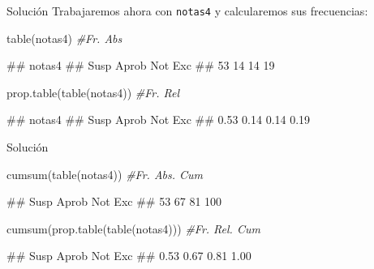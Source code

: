 \documentclass[
  ignorenonframetext,
  aspectratio=169]{beamer}
\newenvironment{Shaded}{\begin{snugshade}}{\end{snugshade}}
\newcommand{\CommentTok}[1]{\textcolor[rgb]{0.56,0.35,0.01}{\textit{#1}}}
\newcommand{\FunctionTok}[1]{\textcolor[rgb]{0.00,0.00,0.00}{#1}}
\newcommand{\NormalTok}[1]{#1}
\let\oldverbatim\verbatim
\let\endoldverbatim\endverbatim
\renewenvironment{verbatim}{\tiny\oldverbatim}{\endoldverbatim}
\begin{document}
\begin{frame}[fragile]{Solución}
\protect\hypertarget{soluciuxf3n-25}{}
Trabajaremos ahora con \texttt{notas4} y calcularemos sus frecuencias:

\begin{Shaded}
\begin{Highlighting}[]
\FunctionTok{table}\NormalTok{(notas4) }\CommentTok{\#Fr. Abs}
\end{Highlighting}
\end{Shaded}

\begin{verbatim}
## notas4
##  Susp Aprob   Not   Exc 
##    53    14    14    19
\end{verbatim}

\begin{Shaded}
\begin{Highlighting}[]
\FunctionTok{prop.table}\NormalTok{(}\FunctionTok{table}\NormalTok{(notas4)) }\CommentTok{\#Fr. Rel}
\end{Highlighting}
\end{Shaded}

\begin{verbatim}
## notas4
##  Susp Aprob   Not   Exc 
##  0.53  0.14  0.14  0.19
\end{verbatim}
\end{frame}

\begin{frame}[fragile]{Solución}
\protect\hypertarget{soluciuxf3n-26}{}
\begin{Shaded}
\begin{Highlighting}[]
\FunctionTok{cumsum}\NormalTok{(}\FunctionTok{table}\NormalTok{(notas4)) }\CommentTok{\#Fr. Abs. Cum}
\end{Highlighting}
\end{Shaded}

\begin{verbatim}
##  Susp Aprob   Not   Exc 
##    53    67    81   100
\end{verbatim}

\begin{Shaded}
\begin{Highlighting}[]
\FunctionTok{cumsum}\NormalTok{(}\FunctionTok{prop.table}\NormalTok{(}\FunctionTok{table}\NormalTok{(notas4))) }\CommentTok{\#Fr. Rel. Cum}
\end{Highlighting}
\end{Shaded}

\begin{verbatim}
##  Susp Aprob   Not   Exc 
##  0.53  0.67  0.81  1.00
\end{verbatim}
\end{frame}
\end{document}

